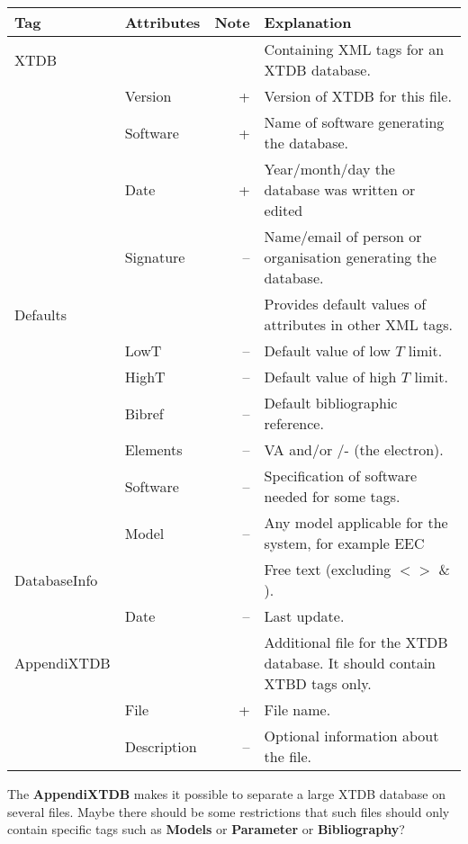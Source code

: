 \documentclass{article}
\begin{document}
\bigskip
\begin{tabular}{|p{} p{} r p{}|}\hline
  Tag & Attributes & Note & Explanation\\\hline

  XTDB    & && Containing XML tags for an XTDB database.\\
          & Version & + & Version of XTDB for this file.\\
          &Software & + & Name of software generating the database.\\
          &Date     & + & Year/month/day the database was written or edited\\
          &Signature& -- & Name/email of person or organisation generating the database.\\\hline
  
  Defaults & && Provides default values of attributes in other XML tags.\\
           & LowT & -- & Default value of low $T$ limit.\\
           & HighT & -- & Default value of high $T$ limit.\\
           & Bibref & -- & Default bibliographic reference. \\
           & Elements & -- & VA and/or /- (the electron).\\
           & Software & -- & Specification of software needed for some tags.\\
           & Model & -- & Any model applicable for the system, for example EEC\\\hline

  DatabaseInfo & && Free text (excluding $< >$ \& ).\\
           & Date & -- & Last update.\\\hline

  AppendiXTDB & && Additional file for the XTDB database.  It should
                   contain XTBD tags only. \\
              & File & + & File name.\\
              & Description & -- & Optional information about the file.\\\hline
\end{tabular}

\bigskip
The {\bf AppendiXTDB} makes it possible to separate a large XTDB
database on several files.  Maybe there should be some restrictions
that such files should only contain specific tags such as {\bf Models}
or {\bf Parameter} or {\bf Bibliography}?
\end{document}

